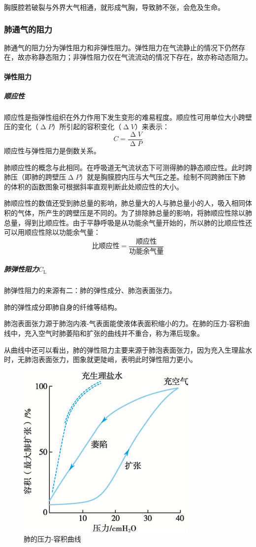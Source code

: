 胸膜腔若破裂与外界大气相通，就形成气胸，导致肺不张，会危及生命。

\subsubsection{肺通气的阻力}

肺通气的阻力分为弹性阻力和非弹性阻力。弹性阻力在气流静止的情况下仍然存在，故亦称静态阻力；非弹性阻力仅在气流流动的情况下存在，故亦称动态阻力。

\paragraph{弹性阻力}

\subparagraph{顺应性}

顺应性是指弹性组织在外力作用下发生变形的难易程度。顺应性可用单位大小跨壁压的变化（$\upDelta P$）所引起的容积变化（$\upDelta V$）来表示：\[C=\frac{\upDelta V}{\upDelta P}\]
顺应性与弹性阻力是倒数关系。

肺顺应性的概念与此相同。在呼吸道无气流状态下可测得肺的静态顺应性。此时跨肺压（即肺的跨壁压$\upDelta P$）就是胸膜腔内压与大气压之差。绘制不同跨肺压下肺的体积的函数图象可根据斜率直观判断此处顺应性的大小。

肺顺应性的数值还受到肺总量的影响，肺总量大的人与肺总量小的人，吸入相同体积的气体，所产生的跨壁压是不同的。为了排除肺总量的影响，将肺顺应性除以肺总量，得到比顺应性。由于平静呼吸是从功能余气量开始的，所以肺的比顺应性还可以用顺应性除以功能余气量：\[\text{比顺应性}=\frac{\text{顺应性}}{\text{功能余气量}}\]

\subparagraph{肺弹性阻力$C_{\text{L}}$}

肺弹性阻力的来源有二：肺的弹性成分、肺泡表面张力。

肺的弹性成分即肺自身的纤维等结构。

肺泡表面张力源于肺泡内液-气表面能使液体表面积缩小的力。在肺的压力-容积曲线中，充入空气时肺萎陷和扩张的曲线并不重合，称为滞后现象。

从曲线中还可以看出，肺的弹性阻力主要来源于肺泡表面张力，因为充入生理盐水时，无肺泡表面张力，图象就更陡峭，表明此时弹性阻力更小。

\begin{figure}[htbp]
	\centering
	\includegraphics[width=0.3\linewidth]{Pics/肺的压力-容积曲线}
	\caption{肺的压力-容积曲线}
	\label{fig:p-v_curve_lung}
\end{figure}

